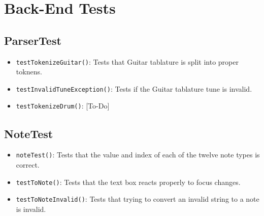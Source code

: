 \documentclass[11pt]{article}
\begin{document}
\section{Back-End Tests}
\label{sec:org30aa61a}
\subsection{ParserTest}
\label{sec:org408513e}
\begin{itemize}
\item \texttt{testTokenizeGuitar()}: Tests that Guitar tablature is split into proper toknens.\\
\item \texttt{testInvalidTuneException()}: Tests if the Guitar tablature tune is invalid.\\
\item \texttt{testTokenizeDrum()}: [To-Do]\\
\end{itemize}
\subsection{NoteTest}
\label{sec:orgcc14605}
\begin{itemize}
\item \texttt{noteTest()}: Tests that the value and index of each of the twelve note types is correct.\\
\item \texttt{testToNote()}: Tests that the text box reacts properly to focus changes.\\
\item \texttt{testToNoteInvalid()}: Tests that trying to convert an invalid string to a note is invalid.\\
\end{itemize}
\end{document}
